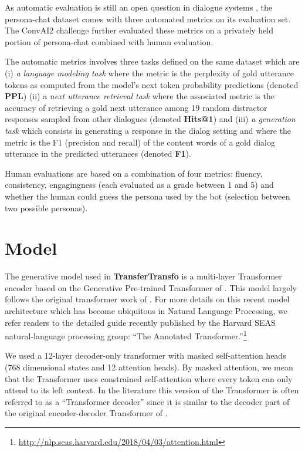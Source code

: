 \documentclass[letterpaper]{article} \usepackage{aaai19}  \usepackage{times}  \usepackage{helvet}  \usepackage{courier}  \usepackage{url}  \usepackage{graphicx}  \usepackage{natbib}
\begin{document}
As automatic evaluation is still an open question in dialogue systems \citep{liu_how_2016}, the {\sc persona-chat} dataset comes with three automated metrics on its evaluation set. The ConvAI2 challenge further evaluated these metrics on a privately held portion of {\sc persona-chat} combined with human evaluation.

The automatic metrics involves three tasks defined on the same dataset which are (i) \textit{a language modeling task} where the metric is the perplexity of gold utterance tokens as computed from the model's next token probability predictions (denoted \textbf{PPL}) (ii) a \textit{next utterance retrieval task} where the associated metric is the accuracy of retrieving a gold next utterance among 19 random distractor responses sampled from other dialogues (denoted \textbf{Hits@1}) and (iii) \textit{a generation task} which consists in generating a response in the dialog setting and where the metric is the F1 (precision and recall) of the content words of a gold dialog utterance in the predicted utterances (denoted \textbf{F1}).

Human evaluations are based on a combination of four metrics: fluency, consistency, engagingness (each evaluated as a grade between 1 and 5) and whether the human could guess the persona used by the bot (selection between two possible personas).

\section{Model}
The generative model used in \textbf{TransferTransfo} is a multi-layer Transformer encoder based on the Generative Pre-trained Transformer of \citeauthor{radford_improving_2018}. This model largely follows the original transformer work of \citeauthor{vaswani_attention_2017}. For more details on this recent model architecture which has become ubiquitous in Natural Language Processing, we refer readers to the detailed guide recently published by the Harvard SEAS natural-language processing group: “The Annotated Transformer.”\footnote{\url{http://nlp.seas.harvard.edu/2018/04/03/attention.html}}

We used a 12-layer decoder-only transformer with masked self-attention heads (768 dimensional states and 12 attention heads). By masked attention, we mean that the Transformer uses constrained self-attention where every token can only attend to its left context. In the literature this version of the Transformer is often referred to as a “Transformer decoder” since it is similar to the decoder part of the original encoder-decoder Transformer of \citet{vaswani_attention_2017}.
\end{document}
